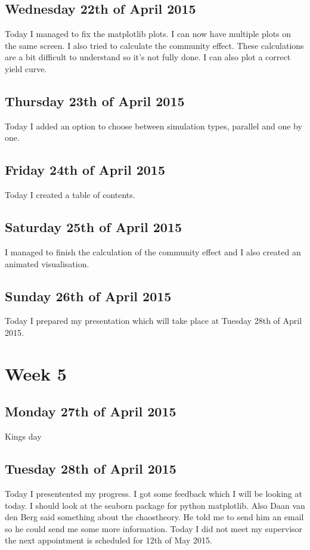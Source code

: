 \documentclass{article}
\begin{document}
\subsection{Wednesday 22th of April 2015}
Today I managed to fix the matplotlib plots. I can now have multiple plots on the same screen. I also tried to calculate the community effect. These calculations are a bit difficult to understand so it's not fully done. I can also plot a correct yield curve.

\subsection{Thursday 23th of April 2015}
Today I added an option to choose between simulation types, parallel and one by one.

\subsection{Friday 24th of April 2015}
Today I created a table of contents.

\subsection{Saturday 25th of April 2015}
I managed to finish the calculation of the community effect and I also created an animated visualisation.

\subsection{Sunday 26th of April 2015}
Today I prepared my presentation which will take place at Tuesday 28th of April 2015.

\section{Week 5}

\subsection{Monday 27th of April 2015}
Kings day

\subsection{Tuesday 28th of April 2015}
Today I presentented my progress. I got some feedback which I will be looking at today. I should look at the seaborn package for python matplotlib. Also Daan van den Berg said something about the chaostheory. He told me to send him an email so he could send me some more information.
Today I did not meet my supervisor the next appointment is scheduled for 12th of May 2015.
\end{document}
